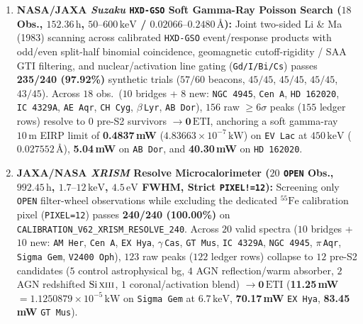 \documentclass[twocolumn,10pt]{article}
\begin{document}
\begin{enumerate}
  \item \textbf{NASA/JAXA \textit{Suzaku} \texttt{HXD-GSO} Soft Gamma-Ray Poisson Search ($18$ Obs., $152.36\,\text{h}$, $50\text{--}600\,\mathrm{keV}$ / $0.02066\text{--}0.2480\,\text{\AA}$):} Joint two-sided Li \& Ma (1983) \cite{LiMa1983} scanning across calibrated \texttt{HXD-GSO} event/response products with odd/even split-half binomial coincidence, geomagnetic cutoff-rigidity / SAA GTI filtering, and nuclear/activation line gating (\texttt{Gd/I/Bi/Cs}) passes \textbf{235/240 (97.92\%)} synthetic trials ($57/60$ beacons, $45/45$, $45/45$, $45/45$, $43/45$). Across $18$ obs.\ ($10$ bridges + $8$ new: \texttt{NGC\,4945}, \texttt{Cen\,A}, \texttt{HD\,162020}, \texttt{IC\,4329A}, \texttt{AE\,Aqr}, \texttt{CH\,Cyg}, $\beta$\,\texttt{Lyr}, \texttt{AB\,Dor}), $156$ raw $\ge 6\sigma$ peaks ($155$ ledger rows) resolve to $0$ pre-S2 survivors $\rightarrow \mathbf{0\,\mathrm{ETI}}$, anchoring a soft gamma-ray $10\,\text{m}$ EIRP limit of \textbf{0.4837\,mW} ($4.83663\times 10^{-7}\,\text{kW}$) on \texttt{EV\,Lac} at $450\,\mathrm{keV}$ ($0.027552\,\text{\AA}$), \textbf{5.04\,mW} on \texttt{AB\,Dor}, and \textbf{40.30\,mW} on \texttt{HD\,162020}.
  \item \textbf{JAXA/NASA \textit{XRISM} Resolve Microcalorimeter ($20$ \texttt{OPEN} Obs., $992.45\,\text{h}$, $1.7\text{--}12\,\mathrm{keV}$, $4.5\,\mathrm{eV}$ FWHM, Strict \texttt{PIXEL!=12}):} Screening only \texttt{OPEN} filter-wheel observations while excluding the dedicated $^{55}\mathrm{Fe}$ calibration pixel (\texttt{PIXEL=12}) passes \textbf{240/240 (100.00\%)} on \texttt{CALIBRATION\_V62\_XRISM\_RESOLVE\_240}. Across $20$ valid spectra ($10$ bridges + $10$ new: \texttt{AM\,Her}, \texttt{Cen\,A}, \texttt{EX\,Hya}, $\gamma$\,\texttt{Cas}, \texttt{GT\,Mus}, \texttt{IC\,4329A}, \texttt{NGC\,4945}, $\pi$\,\texttt{Aqr}, \texttt{Sigma\,Gem}, \texttt{V2400\,Oph}), $123$ raw peaks ($122$ ledger rows) collapse to $12$ pre-S2 candidates ($5$ control astrophysical bg, $4$ AGN reflection/warm absorber, $2$ AGN redshifted $\mathrm{Si\,\textsc{xiii}}$, $1$ coronal/activation blend) $\rightarrow \mathbf{0\,\mathrm{ETI}}$ (\textbf{11.25\,mW} $= 1.1250879\times 10^{-5}\,\text{kW}$ on \texttt{Sigma\,Gem} at $6.7\,\mathrm{keV}$, \textbf{70.17\,mW} \texttt{EX\,Hya}, \textbf{83.45\,mW} \texttt{GT\,Mus}).

\end{enumerate}
\end{document}
